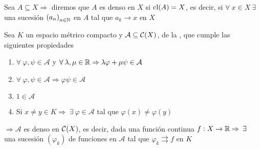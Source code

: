 \begin{definition}
    Sea $A \subseteq X \Rightarrow$ diremos que $A$ es denso en $X$ si $\mathrm{cl}(A) = X$, es decir, si $\forall \: x \in X \: \exists$ una sucesión ${(a_n)}_{n \in \mathbb{N}}$ en $A$ tal que $a_k \to x$ en $X$
\end{definition}

\begin{theorem}
    Sea $K$ un espacio métrico compacto y $\mathcal{A} \subseteq \mathcal{C}(X)$, de la , que cumple las siguientes propiedades

    \begin{enumerate}
        \item $\forall \: \varphi, \psi \in \mathcal{A} $ y $\forall \: \lambda, \mu \in \mathbb{R} \Rightarrow \lambda \varphi + \mu \psi \in \mathcal{A}$
        \item $\forall \: \varphi, \psi \in \mathcal{A} \Rightarrow \varphi \psi \in \mathcal{A}$
        \item $1 \in \mathcal{A}$
        \item Si $x \neq y \in K \Rightarrow \: \exists \: \varphi \in \mathcal{A}$ tal que $\varphi(x) \neq \varphi(y)$
    \end{enumerate}

    $\Rightarrow \mathcal{A}$ es denso en $\mathcal{C}(X)$, es decir, dada una función continua $f : X \to \mathbb{R} \Rightarrow \: \exists \: $ una sucesión $(\varphi_k)$ de funciones en $\mathcal{A}$ tal que $\varphi_k \rightrightarrows f$ en $K$ 
\end{theorem}
